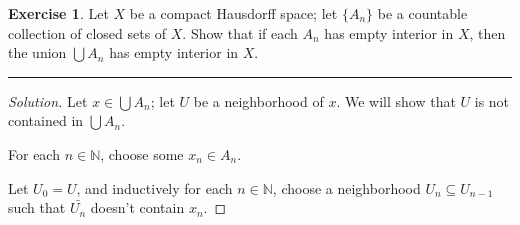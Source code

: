 \documentclass{article}
\theoremstyle{definition}
\newtheorem{exercise}{Exercise}[section]
\begin{document}
\begin{exercise}
  Let $X$ be a compact Hausdorff space; let $\{A_n\}$ be a countable collection of closed sets of $X$. Show that if each $A_n$ has empty interior in $X$, then the union $\bigcup A_n$ has empty interior in $X$.
\end{exercise}
\hrule
\begin{proof}[Solution]
  Let $x\in \bigcup A_n$; let $U$ be a neighborhood of $x$. We will show that $U$ is not contained in $\bigcup A_n$.

  For each $n\in\mathbb{N}$, choose some $x_n\in A_n$.

  Let $U_0 = U$, and inductively for each $n\in\mathbb{N}$, choose a neighborhood $U_n\subseteq U_{n-1}$ such that $\bar{U_n}$ doesn't contain $x_n$.
\end{proof}

\pagebreak
\end{document}
